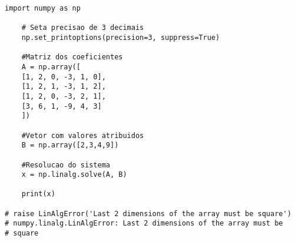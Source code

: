 \begin{lstlisting}
import numpy as np

    # Seta precisao de 3 decimais
    np.set_printoptions(precision=3, suppress=True)
    
    #Matriz dos coeficientes
    A = np.array([
    [1, 2, 0, -3, 1, 0], 
    [1, 2, 1, -3, 1, 2], 
    [1, 2, 0, -3, 2, 1], 
    [3, 6, 1, -9, 4, 3]
    ])

    #Vetor com valores atribuidos
    B = np.array([2,3,4,9])
    
    #Resolucao do sistema
    x = np.linalg.solve(A, B)
    
    print(x)

# raise LinAlgError('Last 2 dimensions of the array must be square')
# numpy.linalg.LinAlgError: Last 2 dimensions of the array must be 
# square
\end{lstlisting}
